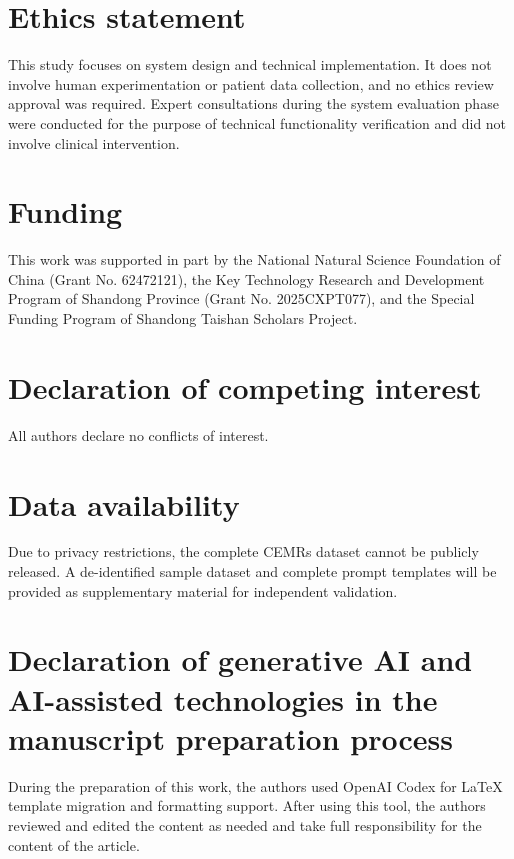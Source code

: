 \section*{Ethics statement}
This study focuses on system design and technical implementation. It does not involve human experimentation or patient data collection, and no ethics review approval was required. Expert consultations during the system evaluation phase were conducted for the purpose of technical functionality verification and did not involve clinical intervention.

\section*{Funding}
This work was supported in part by the National Natural Science Foundation of China (Grant No. 62472121), the Key Technology Research and Development Program of Shandong Province (Grant No. 2025CXPT077), and the Special Funding Program of Shandong Taishan Scholars Project.

\section*{Declaration of competing interest}
All authors declare no conflicts of interest.

\section*{Data availability}
Due to privacy restrictions, the complete CEMRs dataset cannot be publicly released. A de-identified sample dataset and complete prompt templates will be provided as supplementary material for independent validation.

\section*{Declaration of generative AI and AI-assisted technologies in the manuscript preparation process}
During the preparation of this work, the authors used OpenAI Codex for LaTeX template migration and formatting support. After using this tool, the authors reviewed and edited the content as needed and take full responsibility for the content of the article.
